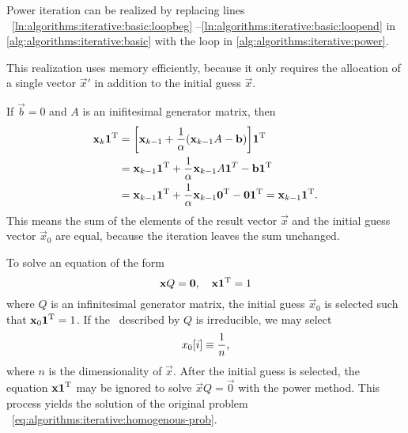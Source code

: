 Power iteration can be realized by replacing lines%
~\ref{ln:algorithms:iterative:basic:loopbeg}%
--\ref{ln:algorithms:iterative:basic:loopend} in
\cref{alg:algorithms:iterative:basic} with the loop in
\cref{alg:algorithms:iterative:power}.

This realization uses memory efficiently, because it only requires the
allocation of a single vector $\vec{x}'$ in addition to the initial
guess $\vec{x}$.

\begin{obs}
  \label{obs:algorithms:iterative:power-keepnorm}
  If $\vec{b} = 0$ and $A$ is an inifitesimal generator matrix, then
  \begin{align}
    \vec{x}_k \vec{1}^\T &= \mleft[ \vec{x}_{k - 1} + \frac{1}{\alpha}
                           \mleft( \vec{x}_{k - 1} A - \vec{b}
                           \mright) \mright] \vec{1}^\T \\
                         &= \vec{x}_{k - 1} \vec{1}^\T +
                           \frac{1}{\alpha} \vec{x}_{k - 1} A
                           \vec{1}^T - \vec{b} \vec{1}^\T \\
                         &= \vec{x}_{k - 1} \vec{1}^\T +
                           \frac{1}{\alpha} \vec{x}_{k - 1} \vec{0}^\T
                           - \vec{0} \vec{1}^\T = \vec{x}_{k - 1} \vec{1}^\T.
  \end{align}
  This means the sum of the elements of the result vector $\vec{x}$
  and the initial guess vector $\vec{x}_0$ are equal, because the
  iteration leaves the sum unchanged.
\end{obs}

To solve an equation of the form
\begin{equation}
  \label{eq:algorithms:iterative:homogenous-prob}
  \bm{\mathrm{x}} Q = \bm{\mathrm{0}},\quad \bm{\mathrm{x}} \bm{\mathrm{1}}^{\mathrm{T}} = 1
\end{equation}
where $Q$ is an infinitesimal generator matrix, the initial guess
$\vec{x}_0$ is selected such that $\bm{\mathrm{x}}_0 \bm{\mathrm{1}}^{\mathrm{T}} = 1$. If the
\CTMC\ described by $Q$ is irreducible, we may select
\begin{equation}
  \label{eq:algorithms:iterative:power-init}
  x_0[i] \equiv \frac{1}{n} \text,
\end{equation}
where $n$ is the dimensionality of $\vec{x}$. After the initial guess
is selected, the equation $\bm{\mathrm{x}} \bm{\mathrm{1}}^{\mathrm{T}}$ may be ignored to solve
$\vec{x} Q = \vec{0}$ with the power method. This process yields the
solution of the original problem%
~\eqref{eq:algorithms:iterative:homogenous-prob}.

